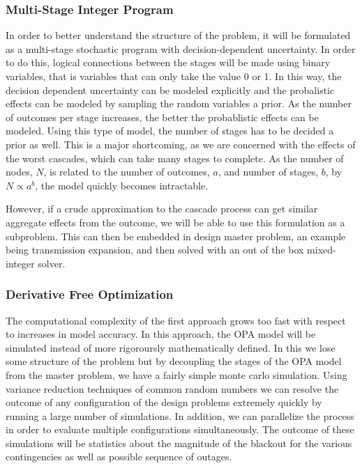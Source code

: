 \subsubsection{Multi-Stage Integer Program}
In order to better understand the structure of the problem, it will be formulated as a multi-stage stochastic program with decision-dependent uncertainty.  In order to do this, logical connections between the stages will be made using binary variables, that is variables that can only take the value 0 or 1.  In this way, the decision dependent uncertainty can be modeled explicitly and the probalistic effects can be modeled by sampling the random variables a prior.  As the number of outcomes per stage increases, the better the probablistic effects can be modeled.  Using this type of model, the number of stages has to be decided a prior as well.  This is a major shortcoming, as we are concerned with the effects of the worst cascades, which can take many stages to complete.  As the number of nodes, $N$, is related to the number of outcomes, $a$, and number of stages, $b$, by $N \propto a^{b}$, the model quickly becomes intractable. 

 However, if a crude approximation to the cascade process can get similar aggregate effects from the outcome, we will be able to use this formulation as a subproblem.  This can then be embedded in design master problem, an example being transmission expansion, and then solved with an out of the box mixed-integer solver.

\subsubsection{Derivative Free Optimization}
The computational complexity of the first approach grows too fast with respect to increases in model accuracy.  In this approach, the OPA model will be simulated instead of more rigoroursly mathematically defined.  In this we lose some structure of the problem but by decoupling the stages of the OPA model from the master problem, we have a fairly simple monte carlo simulation.  Using variance reduction techniques of common random numbers we can resolve the outcome of any configuration of the design problems extremely quickly by running a large number of simulations.  In addition, we can parallelize the process in order to evaluate multiple configurations simultaneously.  The outcome of these simulations will be statistics about the magnitude of the blackout for the various contingencies as well as possible sequence of outages.


